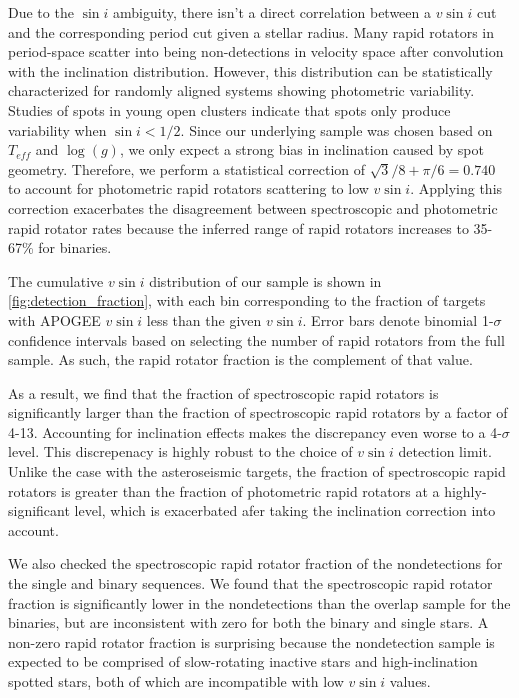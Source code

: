 \documentclass[manuscript]{aastex6}
\newcommand{\vsini}{\ensuremath{v \sin i}}
\newcommand{\Teff}{\ensuremath{T_{eff}}}
\newcommand{\logg}{\ensuremath{\log(g)}}
\begin{document}
Due to the \(\sin i\) ambiguity, there isn't a direct correlation
between a \vsini{} cut and the corresponding period cut given a stellar radius.
Many rapid rotators in period-space scatter into being non-detections in
velocity space after convolution with the inclination distribution. However,
this distribution can be statistically characterized for randomly
aligned systems showing photometric variability. Studies of spots in young open
clusters indicate that spots only produce variability when \(\sin i < 1/2\). 
Since our underlying sample was chosen based on
\Teff{} and \logg{}, we only expect a strong bias in inclination caused by spot
geometry.
Therefore, we perform a statistical correction of \(\sqrt{3}/8+\pi/6=0.740\)
to account for photometric rapid rotators scattering to low
\vsini{}. Applying this correction exacerbates the disagreement between
spectroscopic and photometric rapid rotator rates because the inferred range of
rapid rotators increases to 35-67\% for binaries.

The cumulative \vsini{} distribution of our sample is shown 
in \cref{fig:detection_fraction}, with each bin corresponding to the
fraction of targets with APOGEE \vsini{} less than the given
\vsini{}. Error bars denote  binomial 1-\(\sigma\) confidence 
intervals based on selecting the number of rapid rotators from the full 
sample.  As such, the rapid rotator fraction is the complement of that
value. 

As a result, we find that the fraction of
spectroscopic rapid rotators is significantly larger than the fraction
of spectroscopic rapid rotators by a factor of 4-13. 
Accounting for
inclination effects makes the discrepancy even worse to a 4-\(\sigma\)
level. This discrepenacy is highly robust to the choice of
\vsini{} detection limit. Unlike  
the case with the asteroseismic targets, the fraction of spectroscopic rapid
rotators is greater than the fraction of photometric rapid
rotators at a highly-significant level, which is exacerbated afer taking the
inclination correction into account.

We also checked the spectroscopic rapid rotator fraction of the 
\citet{McQuillan14} nondetections for the single and binary sequences. We 
found that the spectroscopic rapid rotator fraction is significantly
lower in the nondetections than the overlap sample for the binaries, but are 
inconsistent with zero for both the binary and single stars. 
A non-zero rapid rotator fraction is surprising because the nondetection
sample is expected to be comprised of slow-rotating inactive stars and 
high-inclination spotted stars, both of which are incompatible with low 
\vsini{} values. 
\end{document}
